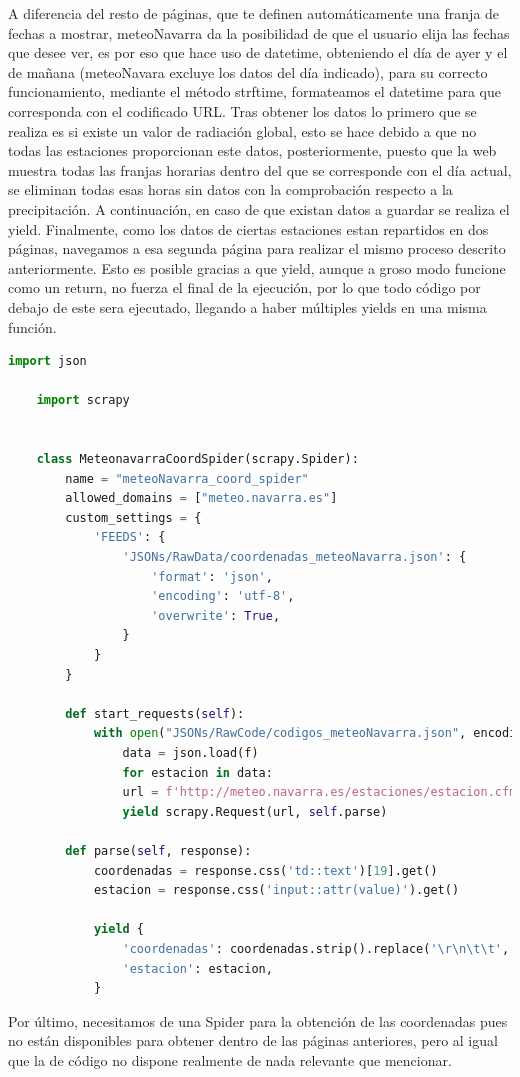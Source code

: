 A diferencia del resto de páginas, que te definen automáticamente una franja de fechas a mostrar, meteoNavarra da la posibilidad de que el usuario elija las fechas que desee ver, es por eso que hace uso de datetime, obteniendo el día de ayer y el de mañana (meteoNavara excluye los datos del día indicado), para su correcto funcionamiento, mediante el método strftime, formateamos el datetime para que corresponda con el codificado URL.\newline
\newline
Tras obtener los datos lo primero que se realiza es si existe un valor de radiación global, esto se hace debido a que no todas las estaciones proporcionan este datos, posteriormente, puesto que la web muestra todas las franjas horarias dentro del  que se corresponde con el día actual, se eliminan todas esas horas sin datos con la comprobación respecto a la precipitación. A continuación, en caso de que existan datos a guardar se realiza el yield.\newline
\newline
Finalmente, como los datos de ciertas estaciones estan repartidos en dos páginas, navegamos a esa segunda página para realizar el mismo proceso descrito anteriormente.\newline
\newline
Esto es posible gracias a que yield, aunque a groso modo funcione como un return, no fuerza el final de la ejecución, por lo que todo código por debajo de este sera ejecutado, llegando a haber múltiples yields en una misma función.

\begin{lstlisting}[language=Python, caption={MeteoNavarra Coordenates Spider}]
	import json
	
	import scrapy
	
	
	class MeteonavarraCoordSpider(scrapy.Spider):
		name = "meteoNavarra_coord_spider"
		allowed_domains = ["meteo.navarra.es"]
		custom_settings = {
			'FEEDS': {
				'JSONs/RawData/coordenadas_meteoNavarra.json': {
					'format': 'json',
					'encoding': 'utf-8',
					'overwrite': True,
				}
			}
		}
		
		def start_requests(self):
			with open("JSONs/RawCode/codigos_meteoNavarra.json", encoding="utf-8") as f:
				data = json.load(f)
				for estacion in data:
				url = f'http://meteo.navarra.es/estaciones/estacion.cfm?IDestacion={estacion["codigo"]}'
				yield scrapy.Request(url, self.parse)
		
		def parse(self, response):
			coordenadas = response.css('td::text')[19].get()
			estacion = response.css('input::attr(value)').get()
			
			yield {
				'coordenadas': coordenadas.strip().replace('\r\n\t\t', ' ').replace(' (*)', ''),
				'estacion': estacion,
			}
\end{lstlisting}

Por último, necesitamos de una Spider para la obtención de las coordenadas pues no están disponibles para obtener dentro de las páginas anteriores, pero al igual que la de código no dispone realmente de nada relevante que mencionar.
